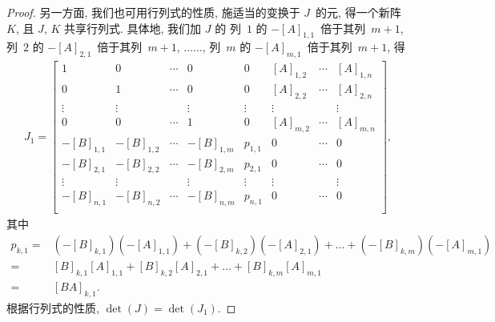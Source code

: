 \documentclass[%
    UTF8,%
    fontset=none,%
    punct=kaiming,%
    zihao=-4,%
    a4paper,%
    oneside,%
]{ctexbook}
\begin{document}
\begin{proof}
    另一方面, 我们也可用行列式的性质,
    施适当的变换于 \(J\)~的元,
    得一个新阵 \(K\),
    且 \(J\), \(K\) 共享行列式.
    具体地, 我们加 \(J\) 的%
    列~\(1\) 的 \(-[A]_{1,1}\)~倍于其列~\(m+1\),
    列~\(2\) 的 \(-[A]_{2,1}\)~倍于其列~\(m+1\),
    \(\dots\dots\),
    列~\(m\) 的 \(-[A]_{m,1}\)~倍于其列~\(m+1\),
    得
    \begin{align*}
        J_1 =
        \begin{bmatrix}
            1          & 0          & \cdots & 0          &
            0          & [A]_{1,2}  & \cdots & [A]_{1,n}    \\
            0          & 1          & \cdots & 0          &
            0          & [A]_{2,2}  & \cdots & [A]_{2,n}    \\
            \vdots     & \vdots     & {}     & \vdots     &
            \vdots     & \vdots     & {}     & \vdots       \\
            0          & 0          & \cdots & 1          &
            0          & [A]_{m,2}  & \cdots & [A]_{m,n}    \\
            -[B]_{1,1} & -[B]_{1,2} & \cdots & -[B]_{1,m} &
            p_{1,1}    & 0          & \cdots & 0            \\
            -[B]_{2,1} & -[B]_{2,2} & \cdots & -[B]_{2,m} &
            p_{2,1}    & 0          & \cdots & 0            \\
            \vdots     & \vdots     & {}     & \vdots     &
            \vdots     & \vdots     & {}     & \vdots       \\
            -[B]_{n,1} & -[B]_{n,2} & \cdots & -[B]_{n,m} &
            p_{n,1}    & 0          & \cdots & 0            \\
        \end{bmatrix},
    \end{align*}
    其中
    \begin{align*}
        p_{k,1}
        = {} &
        (-[B]_{k,1})(-[A]_{1,1})
        + (-[B]_{k,2})(-[A]_{2,1})
        + \dots
        + (-[B]_{k,m})(-[A]_{m,1})
        \\
        = {} &
        [B]_{k,1} [A]_{1,1}
        + [B]_{k,2} [A]_{2,1}
        + \dots
        + [B]_{k,m} [A]_{m,1}
        \\
        = {} &
        [BA]_{k,1}.
    \end{align*}
    根据行列式的性质,
    \(\det {(J)} = \det {(J_1)}\).


\end{proof}
\end{document}
